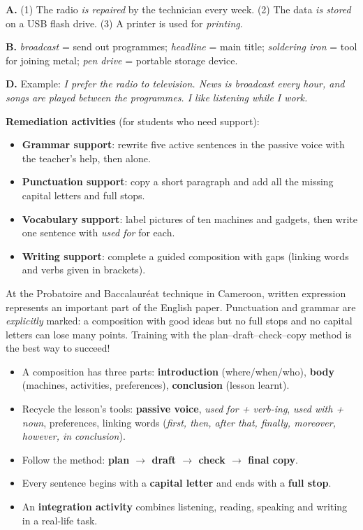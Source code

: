 \documentclass[11pt]{article}
\begin{document}
\begin{corrige}
\textbf{A.} (1) The radio \emph{is repaired} by the technician every week. (2) The data \emph{is stored} on a USB flash drive. (3) A printer is used for \emph{printing}.\par
\textbf{B.} \emph{broadcast} = send out programmes; \emph{headline} = main title; \emph{soldering iron} = tool for joining metal; \emph{pen drive} = portable storage device.\par
\textbf{D.} Example: \emph{I prefer the radio to television. News is broadcast every hour, and songs are played between the programmes. I like listening while I work.}
\end{corrige}

\textbf{Remediation activities} (for students who need support):
\begin{itemize}
\item \textbf{Grammar support}: rewrite five active sentences in the passive voice with the teacher's help, then alone.
\item \textbf{Punctuation support}: copy a short paragraph and add all the missing capital letters and full stops.
\item \textbf{Vocabulary support}: label pictures of ten machines and gadgets, then write one sentence with \emph{used for} for each.
\item \textbf{Writing support}: complete a guided composition with gaps (linking words and verbs given in brackets).
\end{itemize}

\begin{savaistu}
At the Probatoire and Baccalauréat technique in Cameroon, written expression represents an important part of the English paper. Punctuation and grammar are \emph{explicitly} marked: a composition with good ideas but no full stops and no capital letters can lose many points. Training with the plan--draft--check--copy method is the best way to succeed!
\end{savaistu}

\begin{aretenir}
\begin{itemize}
\item A composition has three parts: \textbf{introduction} (where/when/who), \textbf{body} (machines, activities, preferences), \textbf{conclusion} (lesson learnt).
\item Recycle the lesson's tools: \textbf{passive voice}, \emph{used for + verb-ing}, \emph{used with + noun}, preferences, linking words (\emph{first, then, after that, finally, moreover, however, in conclusion}).
\item Follow the method: \textbf{plan $\rightarrow$ draft $\rightarrow$ check $\rightarrow$ final copy}.
\item Every sentence begins with a \textbf{capital letter} and ends with a \textbf{full stop}.
\item An \textbf{integration activity} combines listening, reading, speaking and writing in a real-life task.
\end{itemize}
\end{aretenir}
\end{document}
